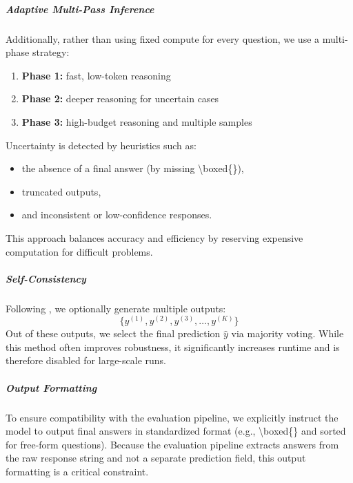 \documentclass{article}
\begin{document}
\subparagraph{Adaptive Multi-Pass Inference} Additionally, rather than using fixed compute for every question, we use a multi-phase strategy:
\begin{enumerate}
    \item \textbf{Phase 1:} fast, low-token reasoning
    \item \textbf{Phase 2:} deeper reasoning for uncertain cases
    \item \textbf{Phase 3:} high-budget reasoning and multiple samples
\end{enumerate}

Uncertainty is detected by heuristics such as:
\begin{itemize}
    \item the absence of a final answer (by missing \textbackslash boxed\{\}),
    \item truncated outputs,
    \item and inconsistent or low-confidence responses.
\end{itemize}
This approach balances accuracy and efficiency by reserving expensive computation for difficult problems.

\subparagraph{Self-Consistency} Following \cite{wang2022selfconsistency}, we optionally generate multiple outputs:
\[\{y^{(1)},y^{(2)},y^{(3)},\dots,y^{(K)}\}\]
Out of these outputs, we select the final prediction $\hat{y}$ via majority voting. While this method often improves robustness, it significantly increases runtime and is therefore disabled for large-scale runs. 

\subparagraph{Output Formatting} To ensure compatibility with the evaluation pipeline, we explicitly instruct the model to output final answers in standardized format (e.g., \textbackslash boxed\{\} and sorted for free-form questions). Because the evaluation pipeline extracts answers from the raw response string and not a separate prediction field, this output formatting is a critical constraint.
\end{document}
